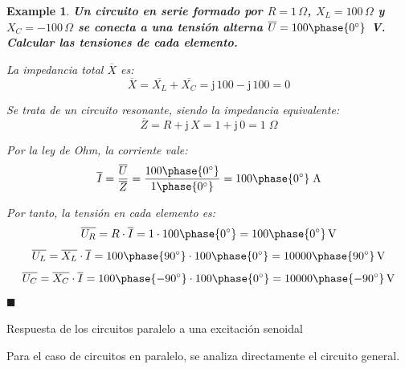 \documentclass[11pt]{book} %
\makeatletter
\numberwithin{dummy}{section}
\theoremstyle{ocrenumbox}
\theoremstyle{blacknumex}
\newtheorem{exampleT}{Example}[chapter]
\theoremstyle{blacknumbox}
\theoremstyle{ocrenum}
\newenvironment{example}{\begin{exampleT}}{\hfill{\tiny\ensuremath{\blacksquare}}\end{exampleT}}
\renewcommand{\section}{\@startsection{section}{1}{\z@}
{-4ex \@plus -1ex \@minus -.4ex}
{1ex \@plus.2ex }
{\normalfont\large\sffamily\bfseries}}
\newlength\esp
\makeatother
\begin{document}
	\vspace{4mm}
	\begin{example}\label{ej.2-4}
		\textbf{Un circuito en serie formado por $R=1\,\Omega$, ${X_L}=100\,\Omega$ y ${X_C}=-100\,\Omega$ se conecta a una tensión alterna $\overline{U}=100\phase{0^\circ}$ V. Calcular las tensiones de cada elemento.}
		
		La impedancia total $\overline{X}$ es:
		\begin{equation*}
			\overline{X}= \overline{X_L}+\overline{X_C}=\mathrm{j}\,100-\mathrm{j}\,100=0
		\end{equation*}
		
		Se trata de un circuito resonante, siendo la impedancia equivalente:
		\begin{equation*}
			\overline{Z}=R+\mathrm{j}\,X=1+\mathrm{j}\,0=1\;\Omega
		\end{equation*}
		
		Por la ley de Ohm, la corriente vale:
		\begin{equation*}
			\overline{I}=\dfrac{\overline{U}}{\overline{Z}}=\dfrac{100\phase{0^\circ}}{1\phase{0^\circ}}=100\phase{0^\circ}\;\text{A}
		\end{equation*}
		
		Por tanto, la tensión en cada elemento es: 
		\begin{equation*}
			\overline{U_R}=R\cdot\overline{I}=1\cdot 100\phase{0^\circ}=100\phase{0^\circ}\,\text{V}
		\end{equation*}
		\begin{equation*}
			\overline{U_L}=\overline{X_L}\cdot\overline{I}=100\phase{90^\circ}\cdot 100\phase{0^\circ}=10000\phase{90^\circ}\,\text{V}
		\end{equation*}
		\begin{equation*}
			\overline{U_C}=\overline{X_C}\cdot\overline{I}=100\phase{-90^\circ}\cdot 100\phase{0^\circ}=10000\phase{-90^\circ}\,\text{V}
		\end{equation*}
	\end{example}
	
	
	\section{Respuesta de los circuitos paralelo a una excitación senoidal}
	
	Para el caso de circuitos en paralelo, se analiza directamente el circuito general. 
	
\end{document}
